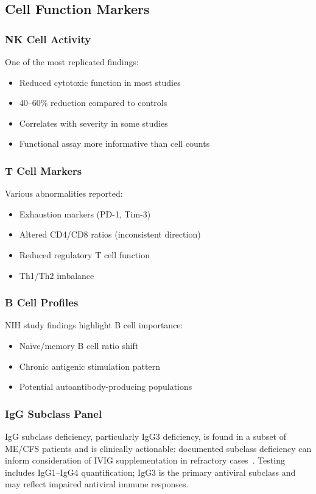 \subsection{Cell Function Markers}

\subsubsection{NK Cell Activity}
One of the most replicated findings:
\begin{itemize}
    \item Reduced cytotoxic function in most studies
    \item 40--60\% reduction compared to controls
    \item Correlates with severity in some studies
    \item Functional assay more informative than cell counts
\end{itemize}

\subsubsection{T Cell Markers}
Various abnormalities reported:
\begin{itemize}
    \item Exhaustion markers (PD-1, Tim-3)
    \item Altered CD4/CD8 ratios (inconsistent direction)
    \item Reduced regulatory T cell function
    \item Th1/Th2 imbalance
\end{itemize}

\subsubsection{B Cell Profiles}
NIH study findings highlight B cell importance:
\begin{itemize}
    \item Naïve/memory B cell ratio shift
    \item Chronic antigenic stimulation pattern
    \item Potential autoantibody-producing populations
\end{itemize}

\subsubsection{IgG Subclass Panel}

IgG subclass deficiency, particularly IgG3 deficiency, is found in a subset of ME/CFS patients and is clinically actionable: documented subclass deficiency can inform consideration of IVIG supplementation in refractory cases~\cite{Maksoud2023}. Testing includes IgG1--IgG4 quantification; IgG3 is the primary antiviral subclass and may reflect impaired antiviral immune responses.

